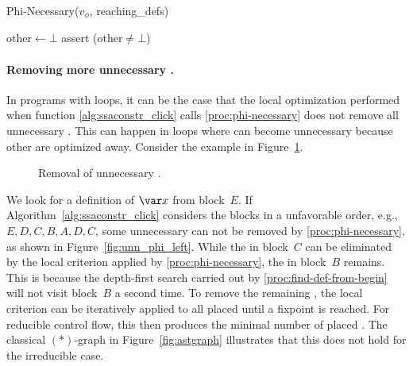 {\begin{procedure}
  \caption{Phi-Necessary($v_\phi$, reaching\_defs)}
  \label{proc:phi-necessary}
  $\textrm{other} \gets \bot$\;
  assert ($\textrm{other} \ne \bot$)\;
\end{procedure}

\paragraph{Removing more unnecessary \phifuns.}

In programs with loops, it can be the case that the local optimization performed when function \ref{alg:ssaconstr_click} calls \ref{proc:phi-necessary} does not remove all unnecessary \phifuns. 
This can happen in loops where \phifuns can become unnecessary because other \phifuns are optimized away. 
Consider the example in Figure~\ref{fig:phiopt}.
\begin{figure}[htbp]
	\begin{center}
		\qquad
	\end{center}
	\caption{Removal of unnecessary \phifuns.}
	\label{fig:phiopt}
\end{figure}
We look for a definition of $\var x$ from block~$E$.
If Algorithm~\ref{alg:ssaconstr_click} considers the blocks in a unfavorable order, e.g., $E,D,C,B,A,D,C$, some unnecessary \phifuns can not be removed by \ref{proc:phi-necessary}, as shown in Figure~\ref{fig:unn_phi_left}.
While the \phifun in block~$C$ can be eliminated by the local criterion applied by \ref{proc:phi-necessary}, the \phifun in block~$B$ remains. 
This is because the depth-first search carried out by \ref{proc:find-def-from-begin} will not visit block~$B$ a second time.
To remove the remaining \phifuns, the local criterion can be iteratively applied to all placed \phifuns until a fixpoint is reached. 
For reducible control flow, this then produces the minimal number of placed \phifuns. 
The classical $(\ast)$-graph in Figure~\ref{fig:astgraph} illustrates that this does not hold for the irreducible case.

}
